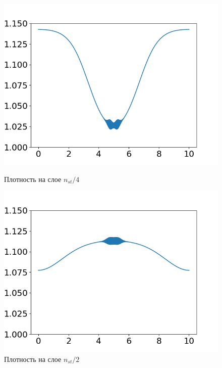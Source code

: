\begin{figure}[h]
	\begin{minipage}[h]{0.47\linewidth}
		\centering
		\includegraphics[width=1\linewidth]{pics/task2/14h_1.png} 
		\caption{Плотность на слое $n_{st} / 4$}
	\end{minipage}
	\hfill
	\begin{minipage}[h]{0.47\linewidth}
		\centering
		\includegraphics[width=1\linewidth]{pics/task2/24h_1.png} 
		\caption{Плотность на слое $n_{st} / 2$}
	\end{minipage}
	\vfill
	\begin{minipage}[h]{0.47\linewidth}
		\centering

\end{minipage}
\end{figure}
